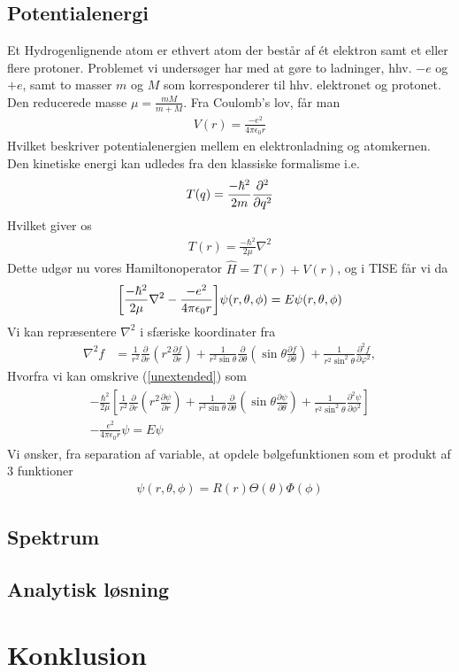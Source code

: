 \documentclass[12pt]{article}
\theoremstyle{definition}
\theoremstyle{remark}
\theoremstyle{definition}
\numberwithin{equation}{section}
\begin{document}
\subsection{Potentialenergi}
Et Hydrogenlignende atom er ethvert atom der består af ét elektron samt et eller flere protoner. Problemet vi undersøger har med at gøre to ladninger, hhv. $-e$ og $+e$, samt to masser $m$ og $M$ som korresponderer til hhv. elektronet og protonet. Den reducerede masse $\mu = \frac{mM}{m+M}$. Fra Coulomb's lov, får man
\begin{align}
    V(r) = \frac{-e^2}{4\pi \epsilon_0 r}
\end{align}
Hvilket beskriver potentialenergien mellem en elektronladning og atomkernen. Den kinetiske energi kan udledes fra den klassiske formalisme i.e.
\begin{align}
    T(q) = \frac{-\hbar^2}{2m}\pdv[2]{q} 
\end{align}
Hvilket giver os
\begin{align}
    T(r) = \frac{-\hbar^2}{2\mu}\nabla^2
\end{align}
Dette udgør nu vores Hamiltonoperator $\hat H = T(r)+V(r)$, og i TISE får vi da
\begin{align}
\label{unextended}
    \qty[\frac{-\hbar^2}{2\mu}\nabla^2 - \frac{-e^2}{4\pi \epsilon_0 r}]\psi(r,\theta,\phi)=E\psi(r,\theta,\phi)
\end{align}
Vi kan repræsentere $\nabla^2$ i sfæriske koordinater fra
\begin{align}
\nabla^2f &= \frac{1}{r^2} \frac{\partial}{\partial r} \left(r^2 \frac{\partial f}{\partial r} \right) + \frac{1}{r^2 \sin \theta} \frac{\partial}{\partial \theta} \left(\sin \theta \frac{\partial f}{\partial \theta} \right) + \frac{1}{r^2 \sin^2 \theta} \frac{\partial^2 f}{\partial \varphi^2},
\end{align}
Hvorfra vi kan omskrive (\ref{unextended}) som
\begin{align}
    \begin{split}
         -\frac{\hbar^2}{2 \mu} \left[ \frac{1}{r^2} \frac{\partial}{\partial r} \left( r^2 \frac{\partial \psi}{\partial r} \right) + \frac{1}{r^2 \sin \theta} \frac{\partial}{\partial \theta} \left( \sin \theta \frac{\partial \psi}{\partial \theta} \right) + \frac{1}{r^2 \sin^2 \theta} \frac{\partial^2 \psi}{\partial \phi^2} \right]\\ - \frac{e^2}{4 \pi \epsilon_0 r} \psi = E \psi
    \end{split}
\end{align}
Vi ønsker, fra separation af variable, at opdele bølgefunktionen som et produkt af 3 funktioner
\begin{align}
    \psi(r, \theta, \phi) = R(r)\Theta (\theta) \Phi (\phi)
\end{align}
\subsection{Spektrum}

\subsection{Analytisk løsning}
\section{Konklusion}

\newpage
\nocite{*}
\printbibliography
\end{document}
